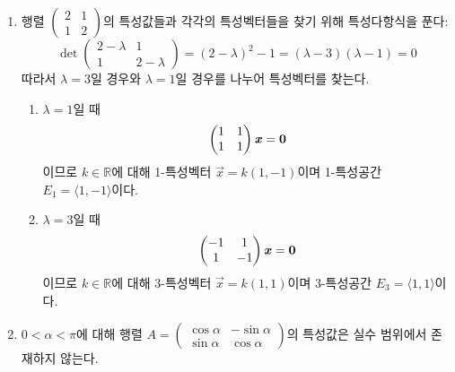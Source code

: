 \documentclass[../engineering_mathematics_lecture_note.tex]{subfiles}
\begin{document}
\begin{example}
    \leavevmode
    \begin{enumerate}
        \item 행렬 $\begin{pmatrix}2 & 1\\1 & 2\end{pmatrix}$의 특성값들과 각각의 특성벡터들을 찾기 위해 특성다항식을 푼다:
            \begin{equation*}
                \det
                \begin{pmatrix}
                    2 - \lambda & 1\\
                    1 & 2 - \lambda
                \end{pmatrix}
                = (2 - \lambda)^2 - 1 = (\lambda - 3)(\lambda - 1) = 0
            \end{equation*}
            따라서 $\lambda = 3$일 경우와 $\lambda = 1$일 경우를 나누어 특성벡터를 찾는다.
            \begin{enumerate}
                \item $\lambda = 1$일 때
                    \begin{equation*}
                        \begin{pmatrix}
                            1 & 1\\
                            1 & 1
                        \end{pmatrix}
                        \bm{\mathit{x}} = \bm{\mathrm{0}}
                    \end{equation*}
                    이므로 $k \in \mathbb R$에 대해 1-특성벡터 $\vec x = k(1, -1)$이며 1-특성공간 $E_1 = \langle 1, -1 \rangle$이다.
                \item $\lambda = 3$일 때
                    \begin{equation*}
                        \begin{pmatrix}
                            -1 & 1\\
                            1 & -1
                        \end{pmatrix}
                        \bm{\mathit{x}} = \bm{\mathrm{0}}
                    \end{equation*}
                    이므로 $k \in \mathbb R$에 대해 3-특성벡터 $\vec x = k(1, 1)$이며 3-특성공간 $E_3 = \langle 1, 1 \rangle$이다.
            \end{enumerate}
        \item $0 < \alpha < \pi$에 대해 행렬 $A = \begin{pmatrix}\cos \alpha & -\sin \alpha\\\sin \alpha & \cos \alpha\end{pmatrix}$의 특성값은 실수 범위에서 존재하지 않는다.

\end{enumerate}
\end{example}
\end{document}
